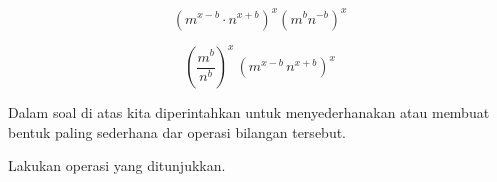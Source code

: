 \documentclass{article}
\begin{document}
\begin{eulernotebook}
\begin{eulercomment}
\begin{eulercomment}
\begin{eulercomment}
\begin{eulercomment}
\begin{eulercomment}
\begin{eulercomment}
\begin{eulercomment}
\begin{eulercomment}
\begin{eulercomment}
\begin{eulercomment}
\begin{eulercomment}
\end{eulercomment}
\begin{eulerformula}
\[
(m^{x-b}\cdot n^{x+b})^x(m^bn^{-b})^x
\]
\end{eulerformula}
\begin{eulerformula}
\[
\left(\frac{m^{b}}{n^{b}}\right)^{x}\,\left(m^{x-b}\,n^{x+b}\right)  ^{x}
\]
\end{eulerformula}
\begin{eulercomment}
Dalam soal di atas kita diperintahkan untuk menyederhanakan atau
membuat bentuk paling sederhana dar operasi bilangan tersebut.

\begin{eulercomment}
\begin{eulercomment}
Lakukan operasi yang ditunjukkan.


\end{eulercomment}
\end{eulercomment}
\end{eulercomment}
\end{eulercomment}
\end{eulercomment}
\end{eulercomment}
\end{eulercomment}
\end{eulercomment}
\end{eulercomment}
\end{eulercomment}
\end{eulercomment}
\end{eulercomment}
\end{eulercomment}
\end{eulernotebook}
\end{document}
